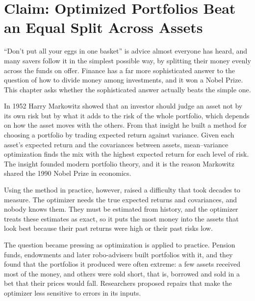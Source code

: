 \makeatletter
\makeatother

\chapter{Claim: Optimized Portfolios Beat an Equal Split Across Assets}
\label{ch:12}

``Don't put all your eggs in one basket'' is advice almost everyone has heard, and many savers follow it in the simplest possible way, by splitting their money evenly across the funds on offer. Finance has a far more sophisticated answer to the question of how to divide money among investments, and it won a Nobel Prize. This chapter asks whether the sophisticated answer actually beats the simple one.

In 1952 Harry Markowitz showed that an investor should judge an asset not by its own risk but by what it adds to the risk of the whole portfolio, which depends on how the asset moves with the others. From that insight he built a method for choosing a portfolio by trading expected return against variance. Given each asset's expected return and the covariances between assets, mean--variance optimization finds the mix with the highest expected return for each level of risk. The insight founded modern portfolio theory, and it is the reason Markowitz shared the 1990 Nobel Prize in economics. 

Using the method in practice, however, raised a difficulty that took decades to measure. The optimizer needs the true expected returns and covariances, and nobody knows them. They must be estimated from history, and the optimizer treats these estimates as exact, so it puts the most money into the assets that look best because their past returns were high or their past risks low.

The question became pressing as optimization is applied to practice. Pension funds, endowments and later robo-advisers built portfolios with it, and they found that the portfolios it produced were often extreme: a few assets received most of the money, and others were sold short, that is, borrowed and sold in a bet that their prices would fall. Researchers proposed repairs that make the optimizer less sensitive to errors in its inputs. 

